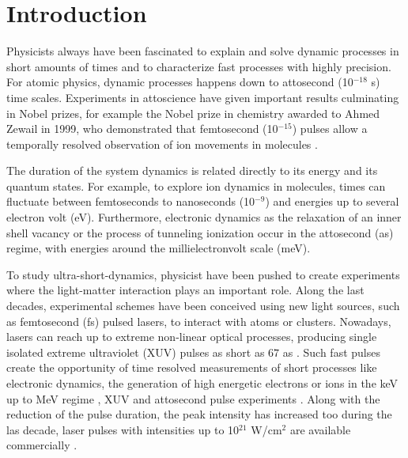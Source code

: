 
\section{Introduction}


Physicists always have been fascinated to explain and solve dynamic processes in short amounts of times and to characterize fast processes with highly precision. For atomic physics, dynamic processes happens down to attosecond (10$^{-18}$ s) time scales. Experiments in attoscience have given important results culminating in  Nobel prizes, for example the Nobel prize in chemistry awarded to Ahmed Zewail  in 1999, who demonstrated that femtosecond  (10$^{-15}$) pulses allow a temporally resolved observation of ion movements in molecules \cite{zewail_femtochemistry:_2000}.

The duration of the system dynamics is related directly to its energy and its quantum states. For example, to explore ion dynamics in molecules, times can fluctuate between femtoseconds to nanoseconds (10$^{-9}$) \cite{gruner_femtosekundenspektroskopie_2013} and energies up to several electron volt (eV). Furthermore, electronic dynamics as the relaxation of an inner shell vacancy \cite{drescher_time-resolved_2002} or the process of tunneling ionization \cite{uiberacker_attosecond_2007} occur in the attosecond (as) regime, with energies around the millielectronvolt scale (meV). 

To study ultra-short-dynamics, physicist have been pushed to create experiments where the light-matter interaction plays an important role. Along the last decades, experimental schemes have been conceived using new light sources, such as femtosecond (fs) pulsed lasers, to interact with atoms or clusters. Nowadays, lasers can reach up to extreme non-linear optical processes, producing single isolated extreme ultraviolet (XUV) pulses as short as $67$ as \cite{zhao_tailoring_2012}. Such fast pulses create the opportunity of time resolved measurements of short processes like electronic dynamics, the generation of high energetic electrons or ions in the keV up to MeV regime \cite{fennel_laser-driven_2010}, XUV and attosecond pulse experiments \cite{stebbings_generation_2011}. Along with the reduction of the pulse duration, the peak intensity has increased too during the las decade, laser pulses with intensities up to 10$^{21}$ W/cm$^{2}$  are available commercially \cite{mourou_optics_2006}.
 
